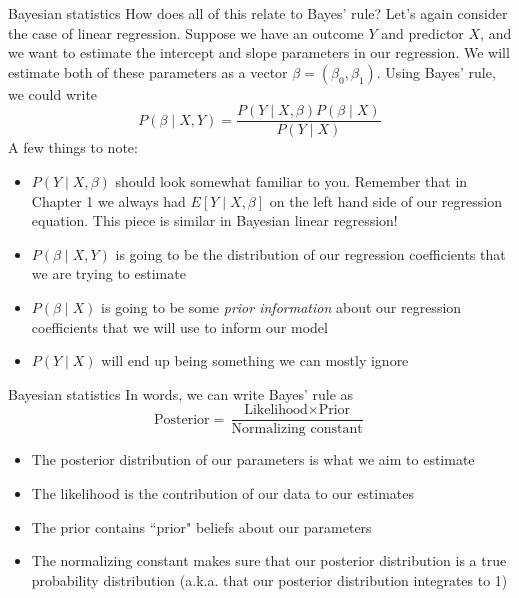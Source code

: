 \documentclass[10pt,t]{beamer}
\begin{document}
\begin{frame}{Bayesian statistics}
How does all of this relate to Bayes' rule? Let's again consider the case of linear regression. Suppose we have an outcome $Y$ and predictor $X$, and we want to estimate the intercept and slope parameters in our regression. We will estimate both of these parameters as a vector $\beta = (\beta_0, \beta_1)$. Using Bayes' rule, we could write
$$
P(\beta \mid X, Y) = \frac{P(Y \mid X, \beta) P(\beta \mid X)}{P(Y \mid X)}
$$
 A few things to note: \pause

\vspace{0.3cm}
\small 

\begin{itemize}
	\item $P(Y \mid X, \beta)$ should look somewhat familiar to you. Remember that in Chapter 1 we always had $E[Y \mid X, \beta]$ on the left hand side of our regression equation. This piece is similar in Bayesian linear regression!
	\item $P(\beta \mid X, Y)$ is going to be the distribution of our regression coefficients that we are trying to estimate
	\item $P(\beta \mid X)$ is going to be some \textit{prior information} about our regression coefficients that we will use to inform our model
	\item $P(Y \mid X)$ will end up being something we can mostly ignore
\end{itemize}

\end{frame}

\begin{frame}{Bayesian statistics}
In words, we can write Bayes' rule as
$$
\text{Posterior} = \frac{\text{Likelihood} \times \text{Prior}}{\text{Normalizing constant}}
$$
\begin{itemize}
	\item The posterior distribution of our parameters is what we aim to estimate
	\item The likelihood is the contribution of our data to our estimates
	\item The prior contains ``prior" beliefs about our parameters
	\item The normalizing constant makes sure that our posterior distribution is a true probability distribution (a.k.a. that our posterior distribution integrates to 1)
\end{itemize}
\end{frame}
\end{document}
